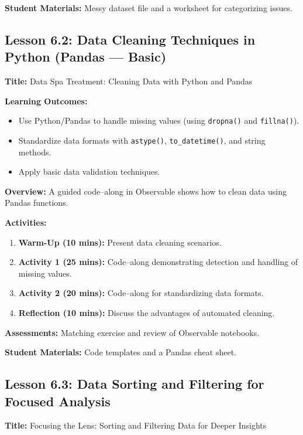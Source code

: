\documentclass{tufte-book}
\begin{document}
\medskip
\textbf{Student Materials:}  
Messy dataset file and a worksheet for categorizing issues.

\subsection{Lesson 6.2: Data Cleaning Techniques in Python (Pandas --- Basic)}
\textbf{Title:} Data Spa Treatment: Cleaning Data with Python and Pandas

\medskip
\textbf{Learning Outcomes:}
\begin{itemize}[leftmargin=*, label={\textbullet}]
    \item Use Python/Pandas to handle missing values (using \texttt{dropna()} and \texttt{fillna()}).
    \item Standardize data formats with \texttt{astype()}, \texttt{to\_datetime()}, and string methods.
    \item Apply basic data validation techniques.
\end{itemize}

\medskip
\textbf{Overview:}  
A guided code--along in Observable shows how to clean data using Pandas functions.

\medskip
\textbf{Activities:}
\begin{enumerate}[label=\arabic*.]
    \item \textbf{Warm-Up (10 mins):} Present data cleaning scenarios.
    \item \textbf{Activity 1 (25 mins):} Code--along demonstrating detection and handling of missing values.
    \item \textbf{Activity 2 (20 mins):} Code--along for standardizing data formats.
    \item \textbf{Reflection (10 mins):} Discuss the advantages of automated cleaning.
\end{enumerate}

\medskip
\textbf{Assessments:}  
Matching exercise and review of Observable notebooks.

\medskip
\textbf{Student Materials:}  
Code templates and a Pandas cheat sheet.

\subsection{Lesson 6.3: Data Sorting and Filtering for Focused Analysis}
\textbf{Title:} Focusing the Lens: Sorting and Filtering Data for Deeper Insights
\end{document}
